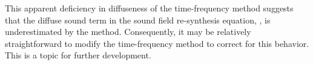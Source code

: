 This apparent deficiency in diffuseness of the time-frequency method suggests that the diffuse sound term in the sound field re-synthesis equation, , is underestimated by the method.
Consequently, it may be relatively straightforward to modify the time-frequency method to correct for this behavior.
This is a topic for further development.